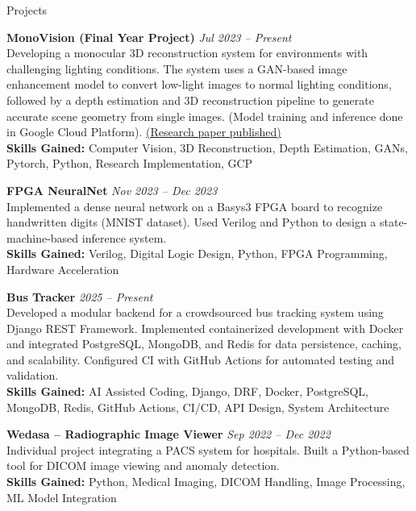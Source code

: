 \documentclass[11pt]{resume}
\begin{document}
\newpage
\begin{rSection}{Projects}

\textbf{MonoVision (Final Year Project)} \hfill \textit{Jul 2023 – Present} \\
Developing a monocular 3D reconstruction system for environments with challenging lighting conditions. The system uses a GAN-based image enhancement model to convert low-light images to normal lighting conditions, followed by a depth estimation and 3D reconstruction pipeline to generate accurate scene geometry from single images. (Model training and inference done in Google Cloud Platform).
 \href{https://www.ijrcom.org/index.php/ijrc/article/view/134}{(Research paper published)} \\
\textbf{Skills Gained:} Computer Vision, 3D Reconstruction, Depth Estimation, GANs, Pytorch, Python, Research Implementation, GCP

\medskip
\textbf{FPGA NeuralNet} \hfill \textit{Nov 2023 – Dec 2023} \\
Implemented a dense neural network on a Basys3 FPGA board to recognize handwritten digits (MNIST dataset). Used Verilog and Python to design a state-machine-based inference system. \\
\textbf{Skills Gained:} Verilog, Digital Logic Design, Python, FPGA Programming, Hardware Acceleration

\textbf{Bus Tracker} \hfill \textit{2025 – Present} \\
Developed a modular backend for a crowdsourced bus tracking system using Django REST Framework. Implemented containerized development with Docker and integrated PostgreSQL, MongoDB, and Redis for data persistence, caching, and scalability. Configured CI with GitHub Actions for automated testing and validation. \\
\textbf{Skills Gained:} AI Assisted Coding, Django, DRF, Docker, PostgreSQL, MongoDB, Redis, GitHub Actions, CI/CD, API Design, System Architecture

\medskip
\textbf{Wedasa – Radiographic Image Viewer} \hfill \textit{Sep 2022 – Dec 2022} \\
Individual project integrating a PACS system for hospitals. Built a Python-based tool for DICOM image viewing and anomaly detection. \\
\textbf{Skills Gained:} Python, Medical Imaging, DICOM Handling, Image Processing, ML Model Integration


\end{rSection}
\end{document}

